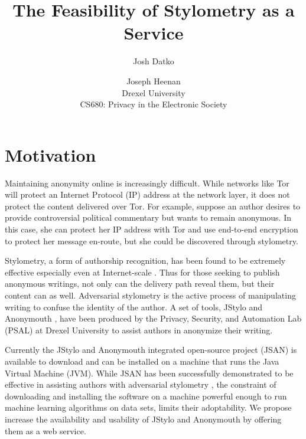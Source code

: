 \documentclass[letterpaper]{article}
\begin{document}
\setcounter{secnumdepth}{1}
\title{The Feasibility of Stylometry as a Service}
\author{Josh Datko \and Joseph Heenan\\ Drexel University\\
CS680: Privacy in the Electronic Society\\
}
\maketitle

\section*{Motivation}\label{sec:motivation}


Maintaining anonymity online is increasingly difficult.  While
networks like Tor \cite{Dingledine04tor:the} will protect an Internet
Protocol (IP) address at the network layer, it does not protect the
content delivered over Tor.  For example, suppose an author desires to
provide controversial political commentary but wants to remain
anonymous.  In this case, she can protect her IP address with Tor and
use end-to-end encryption to protect her message en-route, but she
could be discovered through stylometry.

Stylometry, a form of authorship recognition, has been found to be
extremely effective especially even at
Internet-scale \cite{Narayanan:2012:FIA:2310656.2310687}.  Thus for
those seeking to publish anonymous writings, not only can the delivery
path reveal them, but their content can as well.  Adversarial
stylometry is the active process of manipulating writing to confuse
the identity of the author.  A set of tools, JStylo and
Anonymouth \cite{conf/pet/McDonaldACSG12}, have been produced by the
Privacy, Security, and Automation Lab (PSAL) at Drexel University to
assist authors in anonymize their writing.

Currently the JStylo and Anonymouth integrated open-source project
(JSAN) is available to download and can be installed on a machine that
runs the Java Virtual Machine (JVM).  While JSAN has been successfully
demonstrated to be effective in assisting authors with adversarial
stylometry \cite{journals/tissec/BrennanAG12}, the constraint of
downloading and installing the software on a machine powerful enough
to run machine learning algorithms on data sets, limits their
adoptability.  We propose increase the availability and usability of
JStylo and Anonymouth by offering them as a web service.
\end{document}

